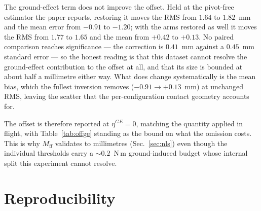 \documentclass[10pt]{article}
\begin{document}
The ground-effect term does not improve the offset. Held at the
pivot-free estimator the paper reports, restoring it moves the RMS
from $1.64$ to $1.82$~mm and the mean error from $-0.91$ to $-1.20$;
with the arms restored as well it moves the RMS from $1.77$ to $1.65$
and the mean from $+0.42$ to $+0.13$. No paired comparison reaches
significance --- the correction is $0.41$~mm against a $0.45$~mm
standard error --- so the honest reading is that this dataset cannot
resolve the ground-effect contribution to the offset at all, and that
its size is bounded at about half a millimetre either way. What does
change systematically is the mean bias, which the fullest inversion
removes ($-0.91 \to +0.13$~mm) at unchanged RMS, leaving the scatter
that the per-configuration contact geometry accounts for.

The offset is therefore reported at $\eta^{GE} = 0$, matching the
quantity applied in flight, with Table~\ref{tab:offge} standing as the
bound on what the omission costs. This is why $M_{\mathrm{ff}}$
validates to millimetres (Sec.~\ref{sec:nls}) even though the
individual thresholds carry a $\sim\!0.2$~N\,m ground-induced budget
whose internal split this experiment cannot resolve.

\section{Reproducibility}
\end{document}
